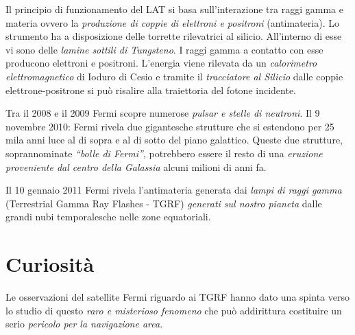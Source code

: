 \documentclass[12pt,a4paper]{article}
\begin{document}
Il principio di funzionamento del LAT si basa sull'interazione tra raggi gamma e materia ovvero la \emph{produzione di coppie di elettroni e positroni} (antimateria). Lo strumento ha a disposizione delle torrette rilevatrici al silicio. All'interno di esse vi sono delle \emph{lamine sottili di Tungsteno}. I raggi gamma a contatto con esse producono elettroni e positroni. L'energia viene rilevata da un \emph{calorimetro elettromagnetico} di Ioduro di Cesio e tramite il \emph{tracciatore al Silicio} dalle coppie elettrone-positrone si può risalire alla traiettoria del fotone incidente.

Tra il 2008 e il 2009 Fermi scopre numerose \emph{pulsar e stelle di neutroni}. Il 9 novembre 2010: Fermi rivela due gigantesche strutture che si estendono per 25 mila anni luce al di sopra e al di sotto del piano galattico. Queste due strutture, soprannominate \emph{“bolle di Fermi”}, potrebbero essere il resto di una \emph{eruzione proveniente dal centro della Galassia} alcuni milioni di anni fa. 

Il 10 gennaio 2011 Fermi rivela l’antimateria generata dai \emph{lampi di raggi gamma} (Terrestrial Gamma Ray Flashes - TGRF) \emph{generati sul nostro pianeta} dalle grandi nubi temporalesche nelle zone equatoriali.

\section*{Curiosità}
\label{curiosit}

Le osservazioni del satellite Fermi riguardo ai TGRF hanno dato una spinta verso lo studio di questo \emph{raro e misterioso fenomeno} che può addirittura costituire un serio \emph{pericolo per la navigazione area}. 
\end{document}
